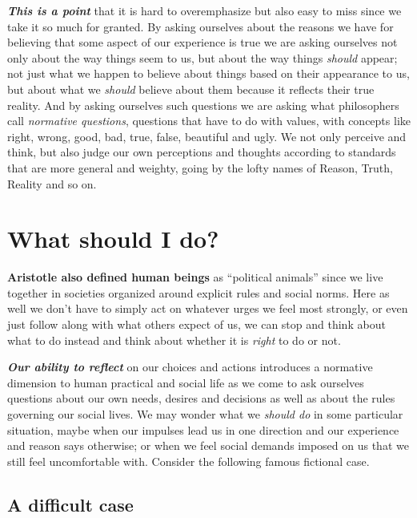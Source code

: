 \documentclass[
  12pt, openany]{book}
\begin{document}
\textbf{\emph{This is a point}} that it is hard to overemphasize but also easy to miss since we take it so much for granted. By asking ourselves about the reasons we have for believing that some aspect of our experience is true we are asking ourselves not only about the way things seem to us, but about the way things \emph{should} appear; not just what we happen to believe about things based on their appearance to us, but about what we \emph{should} believe about them because it reflects their true reality. And by asking ourselves such questions we are asking what philosophers call \emph{normative questions}, questions that have to do with values, with concepts like right, wrong, good, bad, true, false, beautiful and ugly. We not only perceive and think, but also judge our own perceptions and thoughts according to standards that are more general and weighty, going by the lofty names of Reason, Truth, Reality and so on.

\hypertarget{what-should-i-do}{%
\section{What should I do?}\label{what-should-i-do}}

\textbf{Aristotle also defined human beings} as ``political animals'' since we live together in societies organized around explicit rules and social norms. Here as well we don't have to simply act on whatever urges we feel most strongly, or even just follow along with what others expect of us, we can stop and think about what to do instead and think about whether it is \emph{right} to do or not.

\textbf{\emph{Our ability to reflect}} on our choices and actions introduces a normative dimension to human practical and social life as we come to ask ourselves questions about our own needs, desires and decisions as well as about the rules governing our social lives. We may wonder what we \emph{should do} in some particular situation, maybe when our impulses lead us in one direction and our experience and reason says otherwise; or when we feel social demands imposed on us that we still feel uncomfortable with. Consider the following famous fictional case.

\hypertarget{a-difficult-case}{%
\subsection*{A difficult case}\label{a-difficult-case}}
\end{document}
